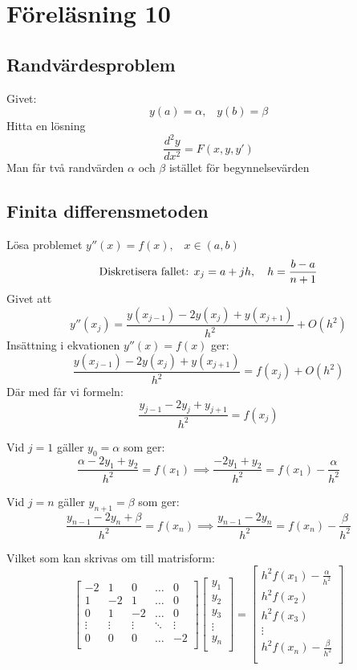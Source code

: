 \documentclass[a4paper,11pt]{article}
\begin{document}
\section{Föreläsning 10}
\subsection{Randvärdesproblem}
Givet:
\[
y(a) = \alpha, \hspace{10pt} y(b) = \beta
\]
Hitta en lösning 
\[
\frac{d^2y}{dx^2} = F(x, y, y')
\]
Man får två randvärden $\alpha$ och $\beta$ istället för begynnelsevärden

\subsection{Finita differensmetoden}
Lösa problemet $y''(x) = f(x), \hspace{10pt} x \in (a,b)$
\[
\text{Diskretisera fallet:  } \\
x_j = a + jh, \hspace{10pt} h = \frac{b-a}{n+1}
\]
Givet att
\[
y''(x_j) = \frac{y(x_{j-1}) - 2y(x_j) + y(x_{j+1})}{h^2} + O(h^2)
\]
Insättning i ekvationen $y''(x) = f(x)$ ger:
\[
\frac{y(x_{j-1}) - 2y(x_j) + y(x_{j+1})}{h^2} = f(x_j) + O(h^2)
\]
Där med får vi formeln:
\[
\frac{y_{j-1} - 2y_j + y_{j+1}}{h^2} = f(x_j)
\]

Vid $j = 1$ gäller $y_0 = \alpha$ som ger:
\[
\frac{\alpha - 2y_1 + y_2}{h^2} = f(x_1) \implies \frac{-2y_1 + y_2}{h^2} = f(x_1) - \frac{\alpha}{h^2}
\]

Vid $j = n$ gäller $y_{n+1} = \beta$ som ger:
\[
\frac{y_{n-1} - 2y_n + \beta}{h^2} = f(x_n) \implies \frac{y_{n-1} - 2y_n}{h^2} = f(x_n) - \frac{\beta}{h^2}
\]

Vilket som kan skrivas om till matrisform:
\[
\begin{bmatrix}
    -2 & 1 & 0 & \hdots & 0 \\
    1 & -2 & 1 & \hdots & 0 \\
    0 & 1 & -2 & \hdots & 0 \\
    \vdots & \vdots & \vdots & \ddots & \vdots \\
    0 & 0 & 0 & \hdots & -2 \\
\end{bmatrix}
\begin{bmatrix}
    y_1 \\
    y_2 \\
    y_3 \\
    \vdots \\
    y_n \\
\end{bmatrix}
=
\begin{bmatrix}
    h^2 f(x_1) - \frac{\alpha}{h^2} \\
    h^2 f(x_2) \\
    h^2 f(x_3) \\
    \vdots \\
    h^2 f(x_n) - \frac{\beta}{h^2} \\
\end{bmatrix}
\]
\end{document}
